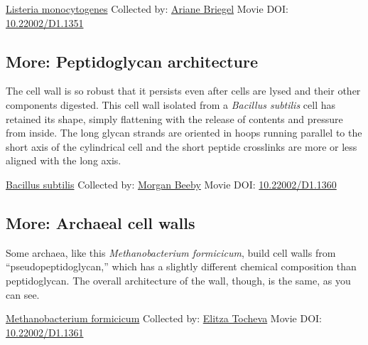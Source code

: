 \documentclass[]{tufte-book}
\begin{document}
\hypertarget{htmlwidget-e470edae9a0512fed59d}{}

\label{fig:2-2}\protect\hyperlink{tree}{Listeria monocytogenes} Collected by: \protect\hyperlink{ariane_briegel}{Ariane Briegel} Movie DOI: \href{https://doi.org/10.22002/D1.1351}{10.22002/D1.1351}

\hypertarget{Peptidoglycan_architecture}{%
\subsection*{More: Peptidoglycan architecture}\label{Peptidoglycan_architecture}}

The cell wall is so robust that it persists even after cells are lysed and their other components digested. This cell wall isolated from a \emph{Bacillus subtilis} cell has retained its shape, simply flattening with the release of contents and pressure from inside. The long glycan strands are oriented in hoops running parallel to the short axis of the cylindrical cell and the short peptide crosslinks are more or less aligned with the long axis.



\hypertarget{htmlwidget-d96c62cb585062c359dc}{}

\label{fig:2-2a}\protect\hyperlink{tree}{Bacillus subtilis} Collected by: \protect\hyperlink{morgan_beeby}{Morgan Beeby} Movie DOI: \href{https://doi.org/10.22002/D1.1360}{10.22002/D1.1360}

\hypertarget{Archaeal_cell_walls}{%
\subsection*{More: Archaeal cell walls}\label{Archaeal_cell_walls}}

Some archaea, like this \emph{Methanobacterium formicicum}, build cell walls from ``pseudopeptidoglycan,'' which has a slightly different chemical composition than peptidoglycan. The overall architecture of the wall, though, is the same, as you can see.



\hypertarget{htmlwidget-1e3234622557ce0f348a}{}

\label{fig:2-2b}\protect\hyperlink{tree}{Methanobacterium formicicum} Collected by: \protect\hyperlink{elitza_tocheva}{Elitza Tocheva} Movie DOI: \href{https://doi.org/10.22002/D1.1361}{10.22002/D1.1361}
\end{document}
